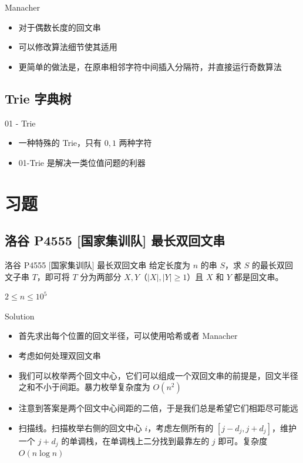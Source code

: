 ﻿\documentclass[aspectratio=169]{ctexbeamer}
\begin{document}
\begin{frame}{Manacher}
    \begin{itemize}
        \item 对于偶数长度的回文串
        \item 可以修改算法细节使其适用
        \item 更简单的做法是，在原串相邻字符中间插入分隔符，并直接运行奇数算法
    \end{itemize}
\end{frame}

\subsection{Trie 字典树}
\begin{frame}{01 - Trie}
    \begin{itemize}
        \item 一种特殊的 Trie，只有 $0,1$ 两种字符
        \item 01-Trie 是解决一类位值问题的利器 
    \end{itemize}
\end{frame}

\section{习题}

\subsection{洛谷 P4555 [国家集训队] 最长双回文串}

\begin{frame}{洛谷 P4555 [国家集训队] 最长双回文串}
    给定长度为 $n$ 的串 $S$，求 $S$ 的最长双回文子串 $T$，即可将 $T$ 分为两部分 $X,Y$（$|X|,|Y|\ge 1$）且 $X$ 和 $Y$ 都是回文串。
    
    $2\le n\le 10^5$
\end{frame}

\begin{frame}{Solution}
    \begin{itemize}
        \item 首先求出每个位置的回文半径，可以使用哈希或者 Manacher
        \item 考虑如何处理双回文串
        \item 我们可以枚举两个回文中心，它们可以组成一个双回文串的前提是，回文半径之和不小于间距。暴力枚举复杂度为 $O(n^2)$
        \item 注意到答案是两个回文中心间距的二倍，于是我们总是希望它们相距尽可能远
        \item 扫描线。扫描枚举右侧的回文中心 $i$，考虑左侧所有的 $[j-d_j,j+d_j]$，维护一个 $j+d_j$ 的单调栈，在单调栈上二分找到最靠左的 $j$ 即可。复杂度 $O(n\log n)$
    \end{itemize}
\end{frame}
\end{document}
